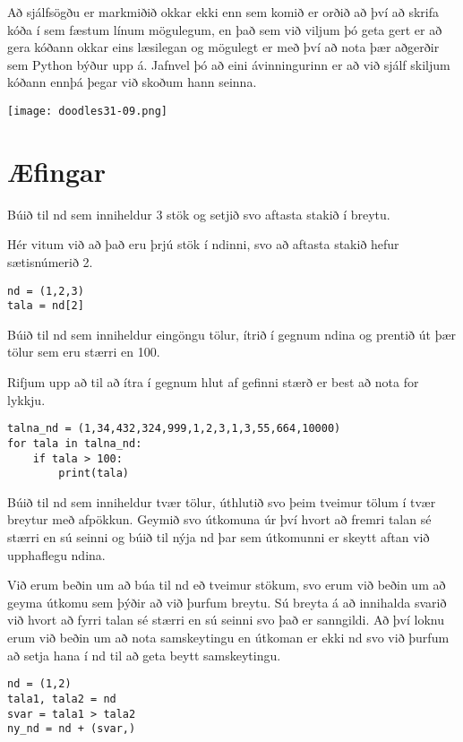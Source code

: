Að sjálfsögðu er markmiðið okkar ekki enn sem komið er orðið að því að skrifa kóða í sem fæstum línum mögulegum, en það sem við viljum þó geta gert er að gera kóðann okkar eins læsilegan og mögulegt er með því að nota þær aðgerðir sem Python býður upp á.
Jafnvel þó að eini ávinningurinn er að við sjálf skiljum kóðann ennþá þegar við skoðum hann seinna.

\begin{center}
	\texttt{[image: doodles31-09.png]}
\end{center}

\newpage
\section{Æfingar}
\begin{exercise}\label{nd1}
Búið til nd sem inniheldur 3 stök og setjið svo aftasta stakið í breytu.
\end{exercise}
\begin{Answer}[ref={nd1}]
Hér vitum við að það eru þrjú stök í ndinni, svo að aftasta stakið hefur sætisnúmerið 2.
\begin{lstlisting}
nd = (1,2,3)
tala = nd[2]\end{lstlisting}
\end{Answer}

\begin{exercise}\label{nd2}
Búið til nd sem inniheldur eingöngu tölur, ítrið í gegnum ndina og prentið út þær tölur sem eru stærri en 100.
\end{exercise}
\begin{Answer}[ref={nd2}]
Rifjum upp að til að ítra í gegnum hlut af gefinni stærð er best að nota for lykkju.
\begin{lstlisting}
talna_nd = (1,34,432,324,999,1,2,3,1,3,55,664,10000)
for tala in talna_nd:
	if tala > 100:
		print(tala)\end{lstlisting}
\end{Answer}

\begin{exercise}\label{nd3}
Búið til nd sem inniheldur tvær tölur, úthlutið svo þeim tveimur tölum í tvær breytur með afpökkun.
Geymið svo útkomuna úr því hvort að fremri talan sé stærri en sú seinni og búið til nýja nd þar sem útkomunni er skeytt aftan við upphaflegu ndina.
\end{exercise}
\begin{Answer}[ref={nd3}]
Við erum beðin um að búa til nd eð tveimur stökum, svo erum við beðin um að geyma útkomu sem þýðir að við þurfum breytu.
Sú breyta á að innihalda svarið við hvort að fyrri talan sé stærri en sú seinni svo það er sanngildi.
Að því loknu erum við beðin um að nota samskeytingu en útkoman er ekki nd svo við þurfum að setja hana í nd til að geta beytt samskeytingu.
	\begin{lstlisting}
nd = (1,2)
tala1, tala2 = nd
svar = tala1 > tala2
ny_nd = nd + (svar,)\end{lstlisting}
\end{Answer}

